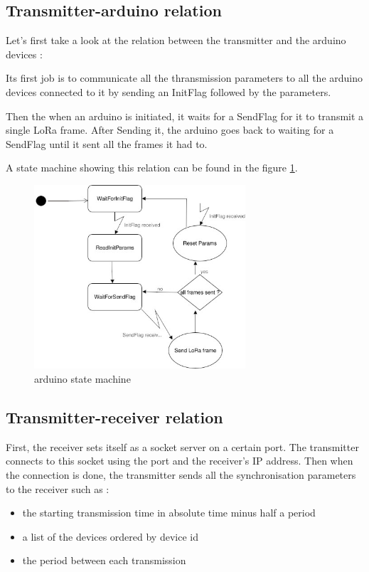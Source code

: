 \documentclass[a4paper, 12pt]{article}
\begin{document}
\subsection{Transmitter-arduino relation}
Let's first take a look at the relation between the transmitter and the arduino devices :

Its first job is to communicate all the thransmission parameters to all the arduino devices connected to it by sending an InitFlag followed by the parameters. 

Then the when an arduino is initiated, it waits for a SendFlag for it to transmit a single LoRa frame. After Sending it, the arduino goes back to waiting for a SendFlag until it sent all the frames it had to.

A state machine showing this relation can be found in the figure \ref{ardSM}.

\begin{figure}
  \begin{center}
    \includegraphics[width=0.7\textwidth]{images/arduinoStateMachine.jpg}
  \end{center}
  \caption{arduino state machine}\label{ardSM}
\end{figure}


\subsection{Transmitter-receiver relation}
First, the receiver sets itself as a socket server on a certain port. The transmitter connects to this socket using the port and the receiver's IP address. Then when the connection is done, the transmitter sends all the synchronisation parameters to the receiver such as : 
\begin{itemize}
  \item the starting transmission time in absolute time minus half a period 
  \item a list of the devices ordered by device id
  \item the period between each transmission
\end{itemize}
\end{document}
